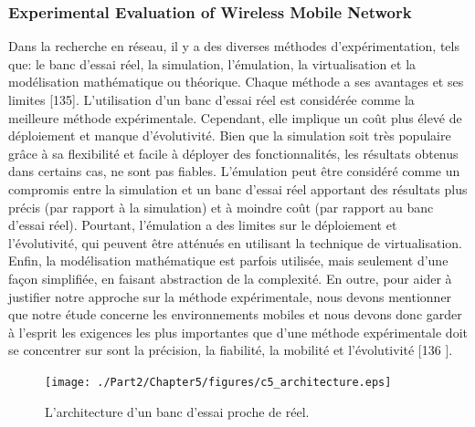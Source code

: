 \subsubsection{Experimental Evaluation of Wireless Mobile Network }
Dans la recherche en réseau, il y a des diverses méthodes d'expérimentation, tels que: le banc d'essai réel, la simulation, l'émulation, la virtualisation et la modélisation mathématique ou théorique. Chaque méthode a ses avantages et ses limites [135]. L'utilisation d'un banc d'essai réel est considérée comme la meilleure méthode expérimentale. Cependant, elle implique un coût plus élevé de déploiement et manque d'évolutivité. Bien que la simulation soit très populaire grâce à sa flexibilité et facile à déployer des fonctionnalités, les résultats obtenus dans certains cas, ne sont pas fiables. L'émulation peut être considéré comme un compromis entre la simulation et un banc d'essai réel apportant des résultats plus précis (par rapport à la simulation) et à moindre coût (par rapport au banc d'essai réel). Pourtant, l'émulation a des limites sur le déploiement et l'évolutivité, qui peuvent être atténués en utilisant la technique de virtualisation. Enfin, la modélisation mathématique est parfois utilisée, mais seulement d'une façon simplifiée, en faisant abstraction de la complexité. En outre, pour aider à justifier notre approche sur la méthode expérimentale, nous devons mentionner que notre étude concerne les environnements mobiles et nous devons donc garder à l'esprit les exigences les plus importantes que d'une méthode expérimentale doit se concentrer sur sont la précision, la fiabilité, la mobilité et l'évolutivité [136 ].

\begin{figure}[h!] 
 \begin{center} 
 \texttt{[image: ./Part2/Chapter5/figures/c5\_architecture.eps]} 
    \caption{L'architecture d'un banc d'essai proche de réel.}
     \label{fig:c5_architecture}
  \end{center} 
\end{figure}

